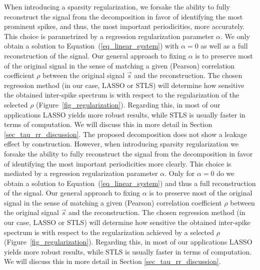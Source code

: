 \documentclass[entropy,article,accept,pdftex,moreauthors]{Definitions/mdpi}
\begin{document}
When introducing a sparsity regularization, we forsake the ability to fully reconstruct the signal from the decomposition in favor of identifying the most prominent spikes, and thus, the most important periodicities, more accurately. This choice is parametrized by a regression regularization parameter $\alpha$. We only obtain a solution to Equation~(\ref{eq_linear_system}) with $\alpha = 0$ as well as a full reconstruction of the signal. Our general approach to fixing $\alpha$ is to preserve most of the original signal in the sense of matching a given (Pearson) correlation coefficient $\rho$ between the original signal $\vec{s}$ and the reconstruction. The chosen regression method (in our case, LASSO or STLS) will determine how sensitive the obtained inter-spike spectrum is with respect to the regularization of the 
selected $\rho$ (Figure~\ref{fig_regularization}). Regarding this, in most of our applications LASSO yields more robust results, while STLS is usually faster in terms of computation. 
We will discuss this in more detail in Section \ref{sec_tau_rr_discussion}.
The proposed decomposition does not show a leakage effect by construction. However, when introducing sparsity regularization we forsake the ability to fully reconstruct the signal from the decomposition in favor of identifying the most important periodicities more clearly. This choice is mediated by a regression regularization parameter $\alpha$. Only for $\alpha = 0$ do we obtain a solution to Equation~(\ref{eq_linear_system}) and thus a full reconstruction of the signal. Our general approach to fixing $\alpha$ is to preserve most of the original signal in the sense of matching a given (Pearson) correlation coefficient $\rho$ between the original signal $\vec{s}$ and the reconstruction. The chosen regression method (in our case, LASSO or STLS) will determine how sensitive the obtained inter-spike spectrum is with respect to the regularization achieved by a 
selected $\rho$ (Figure~\ref{fig_regularization}). Regarding this, in most of our applications LASSO yields more robust results, while STLS is usually faster in terms of computation. %
We will discuss this in more detail in Section \ref{sec_tau_rr_discussion}.
\end{document}
